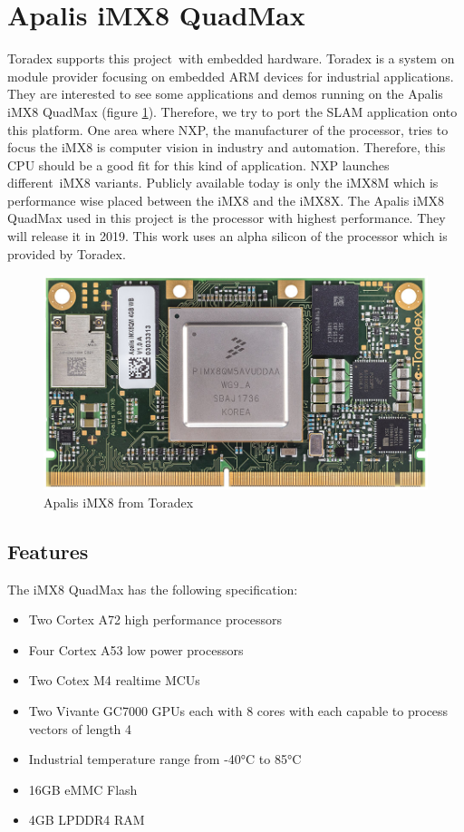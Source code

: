 \documentclass[11pt,a4paper,titlepage,oneside]{report}
\begin{document}
\section{Apalis iMX8 QuadMax}
Toradex supports this project with embedded hardware. Toradex is a system on module provider focusing on embedded ARM devices for industrial applications. They are interested to see some applications and demos running on the Apalis iMX8 QuadMax (figure \ref{fig:apalis_imx8}). Therefore, we try to port the SLAM application onto this platform. One area where NXP, the manufacturer of the processor, tries to focus the iMX8 is computer vision in industry and automation. Therefore, this CPU should be a good fit for this kind of application. NXP launches different iMX8 variants. Publicly available today is only the iMX8M which is performance wise placed between the iMX8 and the iMX8X. The Apalis iMX8 QuadMax used in this project is the processor with highest performance. They will release it in 2019. This work uses an alpha silicon of the processor which is provided by Toradex.

\begin{figure}[H]
  \begin{center}
		\includegraphics[width=1.0\textwidth]{img/apalis_imx8.jpg}
  \end{center}
	\caption{Apalis iMX8 from Toradex}\label{fig:apalis_imx8}
\end{figure}


\subsection{Features}

The iMX8 QuadMax has the following specification:
\begin{itemize}
  \item Two Cortex A72 high performance processors
  \item Four Cortex A53 low power processors
  \item Two Cotex M4 realtime MCUs
  \item Two Vivante GC7000 GPUs each with 8 cores with each capable to process vectors of length 4
  \item Industrial temperature range from -40°C to 85°C
	\item 16GB eMMC Flash
	\item 4GB LPDDR4 RAM
\end{itemize}
\end{document}

